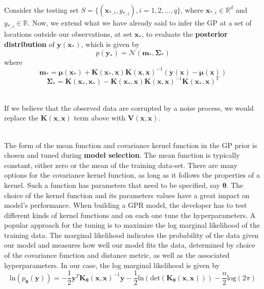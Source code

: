 \documentclass[12pt,a4paper]{article}
\begin{document}
\noindent
\\Consider the testing set $S = \{(\mathbf{x}_{*,i},y_{*,i}), i = 1,2,\dots,q\}$, where $\mathbf{x}_{*,i} \in \mathbb{R}^{d}$ and $y_{*,i} \in \mathbb{R}$. Now, we extend what we have already said to infer the GP at a set of locations outside our observations, at set $\mathbf{x}_{*}$, to evaluate the \textbf{posterior distribution} of $\mathbf{y}(\mathbf{x}_{*})$, which is given by
$$
p(\mathbf{y}_{*})=\mathcal{N}(\mathbf{m}_{*},\mathbf{\Sigma}_{*})
$$
where
$$
\mathbf{m}_{*} = \boldsymbol\mu(\mathbf{x}_{*}) + \mathbf{K}(\mathbf{x}_{*},\mathbf{x})\mathbf{K}(\mathbf{x},\mathbf{x})^{-1}(\mathbf{y}(\mathbf{x}) - \boldsymbol\mu(\mathbf{x}))
$$
$$
\mathbf{\Sigma}_{*} = \mathbf{K}(\mathbf{x}_{*},\mathbf{x}_{*}) - \mathbf{K}(\mathbf{x}_{*},\mathbf{x})\mathbf{K}(\mathbf{x},\mathbf{x})^{-1}\mathbf{K}(\mathbf{x}_{*},\mathbf{x})^{T}
$$

\noindent
\\If we believe that the observed data are corrupted by a noise process, we would replace the $\mathbf{K}(\mathbf{x},\mathbf{x})$ term above with $\mathbf{V}(\mathbf{x},\mathbf{x})$.

\noindent
\\The form of the mean function and covariance kernel function in the GP prior is chosen and tuned during \textbf{model selection}. The mean function is typically constant, either zero or the mean of the training data-set. There are many options for the covariance kernel function, as long as it follows the properties of a kernel. Such a function has parameters that need to be specified, say $\boldsymbol\theta$. The choice of the kernel function and its parameters values have a great impact on model's performance. When building a GPR model, the developer has to test different kinds of kernel functions and on each one tune the hyperparameters. A popular approach for the tuning is to maximize the log marginal likelihood of the training data. The marginal likelihood indicates the probability of the data given our model and measures how well our model fits the data, determined by choice of the covariance function and distance metric, as well as the associated hyperparameters. In our case, the log marginal likelihood is given by
$$
\text{ln}(p_{\boldsymbol\theta}(\mathbf{y})) = -\frac{1}{2}\mathbf{y}^{T}\mathbf{K}_{\boldsymbol\theta}(\mathbf{x},\mathbf{x})^{-1}\mathbf{y} - \frac{1}{2} \text{ln}(\text{det}(\mathbf{K}_{\boldsymbol\theta}(\mathbf{x},\mathbf{x}))) -\frac{n}{2} \text{log}(2\pi)
$$
\end{document}
